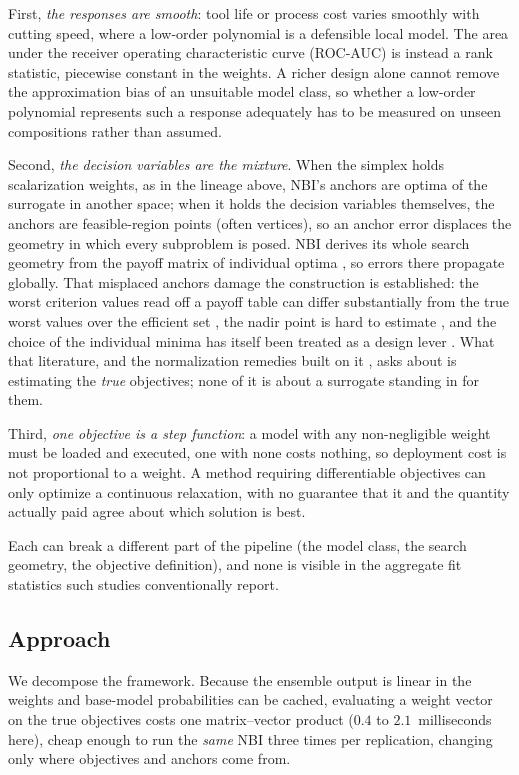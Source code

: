 First, \emph{the responses are smooth}: tool life or process cost varies smoothly with cutting speed, where a
low-order polynomial is a defensible local model. The area under the receiver operating characteristic curve (ROC-AUC)
is instead a rank statistic, piecewise constant in the weights. A richer design alone cannot remove the approximation
bias of an unsuitable model class, so whether a low-order polynomial represents such a response adequately has to be
measured on unseen compositions rather than assumed.

Second, \emph{the decision variables are the mixture}. When the simplex holds scalarization weights, as in the lineage
above, NBI's anchors are optima of the surrogate in another space; when it holds the decision variables themselves,
the anchors are feasible-region points (often vertices), so an anchor error displaces the geometry in which every
subproblem is posed. NBI derives its whole search geometry from the payoff matrix of individual optima
\citep{das1998nbi}, so errors there propagate globally. That misplaced anchors damage the construction is established:
the worst criterion values read off a payoff table can differ substantially from the true worst values over the
efficient set \citep{isermann1988payoff}, the nadir point is hard to estimate \citep{deb2010nadir}, and the choice of the individual
minima has itself been treated as a design lever \citep{herrmann2026nonextreme}. What that literature, and the
normalization remedies built on it \citep{messac2003normalized}, asks about is estimating the \emph{true} objectives;
none of it is about a surrogate standing in for them.

Third, \emph{one objective is a step function}: a model with any non-negligible weight must be loaded and executed,
one with none costs nothing, so deployment cost is not proportional to a weight. A method requiring differentiable
objectives can only optimize a continuous relaxation, with no guarantee that it and the quantity actually paid agree
about which solution is best.

Each can break a different part of the pipeline (the model class, the search geometry, the objective definition),
and none is visible in the aggregate fit statistics such studies conventionally report.

\subsection{Approach}

We decompose the framework. Because the ensemble output is linear in the weights and base-model probabilities can be
cached, evaluating a weight vector on the true objectives costs one matrix--vector product ($0.4$ to
$2.1$~milliseconds here), cheap enough to run the \emph{same} NBI three times per replication, changing only where
objectives and anchors come from.


